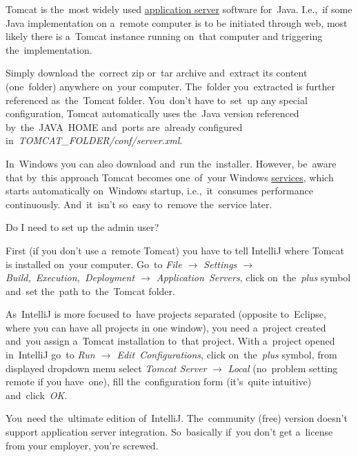 \label{tomcat}
Tomcat is the~most widely used \hyperref[applicationserver]{application server} software for~Java. I.e.,~if some Java implementation on a~remote computer is to be initiated through web, most likely there is a~Tomcat instance running on~that computer and triggering the~implementation.

Simply download the~correct zip or~tar archive and~extract its content (one~folder) anywhere on~your computer. The~folder you~extracted is further referenced as~the~Tomcat folder. You~don't have to~set~up any special configuration, Tomcat automatically uses the~Java version referenced by~the~JAVA~HOME and~ports are~already configured in~\textit{TOMCAT\_FOLDER/conf/server.xml}.

\warning In~Windows you can also download and~run the~installer. However, be~aware that by~this approach Tomcat becomes one~of~your Windows \hyperref[applicationprocessprogramservicethread]{services}, which starts automatically on~Windows startup, i.e.,~it~consumes performance continuously. And~it~isn't so~easy to~remove the~service later.

\newline\todo Do I need to set up the admin user?

First (if you don't use a~remote Tomcat) you have to tell IntelliJ where Tomcat is installed on~your computer. Go~to \textit{File $\rightarrow$ Settings $\rightarrow$ Build,~Execution,~Deployment $\rightarrow$ Application~Servers}, click on~the~\textit{plus} symbol and~set the~path to~the~Tomcat folder.

As~IntelliJ is more focused to~have projects separated (opposite to~Eclipse, where you can have all projects in one window), you need a~project created and~you assign a~Tomcat installation to~that project. With a~project opened in~IntelliJ go~to \textit{Run $\rightarrow$ Edit~Configurations}, click on~the~\textit{plus} symbol, from displayed dropdown menu select \textit{Tomcat Server} $\rightarrow$ \textit{Local} (no~problem setting remote if you have~one), fill the~configuration form (it's~quite intuitive) and~click~\textit{OK}.

\warning You~need the~ultimate edition of~IntelliJ. The~community (free) version doesn't support application server integration. So~basically if~you don't get a~license from your employer, you're screwed.



